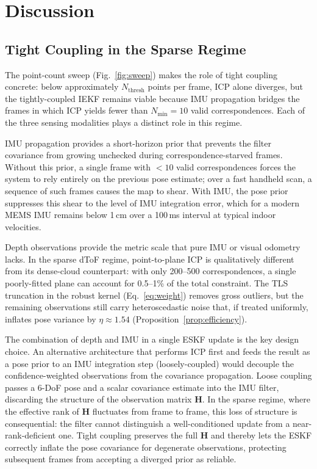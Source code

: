\section{Discussion}
\label{sec:discussion}

\subsection{Tight Coupling in the Sparse Regime}
\label{sec:disc_tight}

The point-count sweep (Fig.~\ref{fig:sweep}) makes the role of tight coupling concrete: below approximately $N_{\text{thresh}}$ points per frame, ICP alone diverges, but the tightly-coupled IEKF remains viable because IMU propagation bridges the frames in which ICP yields fewer than $N_{\min} = 10$ valid correspondences. Each of the three sensing modalities plays a distinct role in this regime.

IMU propagation provides a short-horizon prior that prevents the filter covariance from growing unchecked during correspondence-starved frames. Without this prior, a single frame with $<10$ valid correspondences forces the system to rely entirely on the previous pose estimate; over a fast handheld scan, a sequence of such frames causes the map to shear. With IMU, the pose prior suppresses this shear to the level of IMU integration error, which for a modern MEMS IMU remains below 1\,cm over a 100\,ms interval at typical indoor velocities.

Depth observations provide the metric scale that pure IMU or visual odometry lacks. In the sparse dToF regime, point-to-plane ICP is qualitatively different from its dense-cloud counterpart: with only 200--500 correspondences, a single poorly-fitted plane can account for 0.5--1\% of the total constraint. The TLS truncation in the robust kernel (Eq.~\eqref{eq:weight}) removes gross outliers, but the remaining observations still carry heteroscedastic noise that, if treated uniformly, inflates pose variance by $\eta \approx 1.54$ (Proposition~\ref{prop:efficiency}).

The combination of depth and IMU in a single ESKF update is the key design choice. An alternative architecture that performs ICP first and feeds the result as a pose prior to an IMU integration step (loosely-coupled) would decouple the confidence-weighted observations from the covariance propagation. Loose coupling passes a 6-DoF pose and a scalar covariance estimate into the IMU filter, discarding the structure of the observation matrix $\mathbf{H}$. In the sparse regime, where the effective rank of $\mathbf{H}$ fluctuates from frame to frame, this loss of structure is consequential: the filter cannot distinguish a well-conditioned update from a near-rank-deficient one. Tight coupling preserves the full $\mathbf{H}$ and thereby lets the ESKF correctly inflate the pose covariance for degenerate observations, protecting subsequent frames from accepting a diverged prior as reliable.

